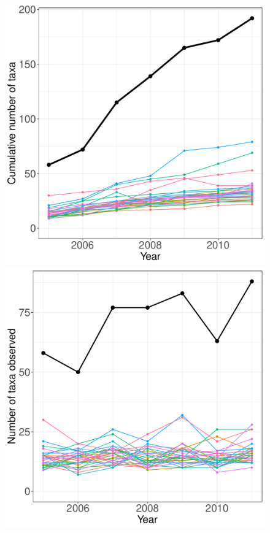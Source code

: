 \documentclass[11pt, oneside]{article}
\begin{document}
\begin{figure}[h!]
\centering
\includegraphics[scale = 0.4]{fce-diatoms-catano_species_accumulation_curve.pdf}
\includegraphics[scale = 0.4]{fce-diatoms-catano_num_taxa_over_time.pdf}

\end{figure}
\end{document}
